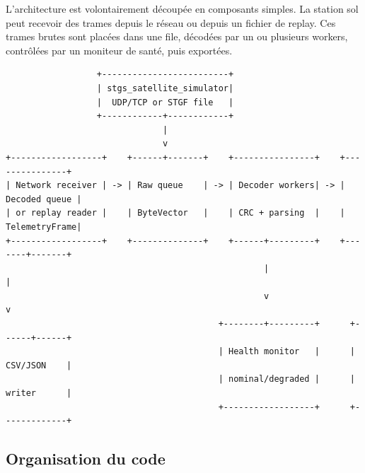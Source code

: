 \documentclass[11pt,a4paper]{article}
\begin{document}
L'architecture est volontairement découpée en composants simples. La station sol peut recevoir des trames depuis le réseau ou depuis un fichier de replay. Ces trames brutes sont placées dans une file, décodées par un ou plusieurs workers, contrôlées par un moniteur de santé, puis exportées.

\begin{lstlisting}
                  +-------------------------+
                  | stgs_satellite_simulator|
                  |  UDP/TCP or STGF file   |
                  +------------+------------+
                               |
                               v
+------------------+    +------+-------+    +----------------+    +---------------+
| Network receiver | -> | Raw queue    | -> | Decoder workers| -> | Decoded queue |
| or replay reader |    | ByteVector   |    | CRC + parsing  |    | TelemetryFrame|
+------------------+    +--------------+    +------+---------+    +-------+-------+
                                                   |                      |
                                                   v                      v
                                          +--------+---------+      +------+------+
                                          | Health monitor   |      | CSV/JSON    |
                                          | nominal/degraded |      | writer      |
                                          +------------------+      +-------------+
\end{lstlisting}

\subsection{Organisation du code}
\end{document}
